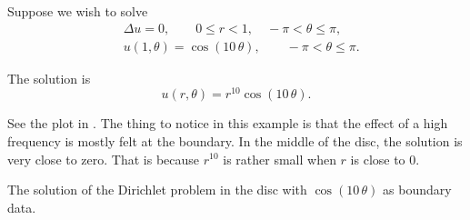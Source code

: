 \documentclass{ximera}
\begin{document}
\begin{example}
    Suppose we wish to solve
    \begin{align*}
        & \Delta u = 0 , \qquad 0 \leq r < 1, \quad -\pi < \theta \leq \pi,\\
        & u(1,\theta) = \cos(10\,\theta), \qquad -\pi < \theta \leq \pi.
    \end{align*}
    
    The solution is
    \begin{equation*}
        u(r,\theta) = r^{10} \cos(10\,\theta) .
    \end{equation*}
    
    See the plot in . The thing to notice in this example is that the effect of a high frequency is mostly felt at the boundary.  In the middle of the disc, the solution is very close to zero.  That is because $r^{10}$ is rather small when $r$ is close to 0.
    \begin{myfig}
        \capstart
        \caption{The solution of the Dirichlet problem in the disc with $\cos(10\,\theta)$ as boundary data.\label{dirichdisc:tenspeedfig}}
    \end{myfig}
\end{example}
\end{document}
